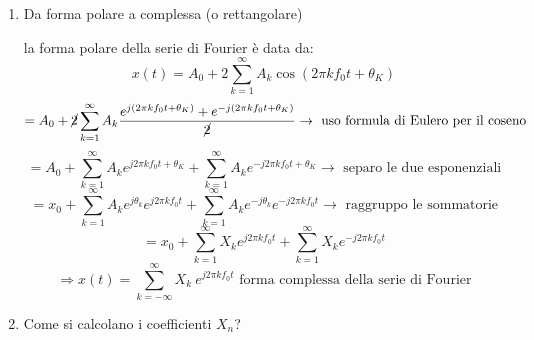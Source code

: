 \documentclass[
  paper=a4,
  ,captions=tableheading
]{scrartcl}
\begin{document}
\begin{enumerate}
\def\labelenumi{\arabic{enumi}.}
\setcounter{enumi}{1}
\item
  Da forma polare a complessa (o rettangolare)

  la forma polare della serie di Fourier è data da: \[
   x(t) = A_0 + 2 \sum_{k=1}^{\infty} A_{k} \cos (2\pi kf_{0}t + \theta_{K})
   \] \[
   = A_0 + \cancel{2} \sum_{k=1}^{\infty} A_{k} \frac{e^{j(2\pi kf_{0}t + \theta_{K})}+e^{-j(2\pi kf_{0}t + \theta_{K})}}{\cancel{2}} \to \text{ uso formula di Eulero per il coseno}
   \] \[
   = A_0 + \sum_{k=1}^{\infty} A_{k} e^{j2\pi kf_{0}t + \theta_{K}}  + \sum_{k=1}^{\infty} A_{k} e^{-j2\pi kf_{0}t + \theta_{K}} \to \text{ separo le due esponenziali}
   \] \[
   = x_0 + \sum_{k=1}^{\infty} A_{k} e^{j\theta_{k}} e^{j2\pi kf_{0}t}  + \sum_{k=1}^{\infty} A_{k} e^{-j\theta_{k}} e^{-j2\pi kf_{0}t}  \to \text{ raggruppo le sommatorie}
   \] \[
   = x_0 + \sum_{k=1}^{\infty} X_k e^{j2\pi kf_{0}t}  + \sum_{k=1}^{\infty} X_k e^{-j2\pi kf_{0}t}
   \] \[
   \Rightarrow x(t) = \sum_{k=-\infty}^{\infty} X_k \ e^{j2\pi kf_{0}t} \text{ forma complessa della serie di Fourier}
   \] \newpage
\item
  Come si calcolano i coefficienti \(X_n\)?


\end{enumerate}
\end{document}
